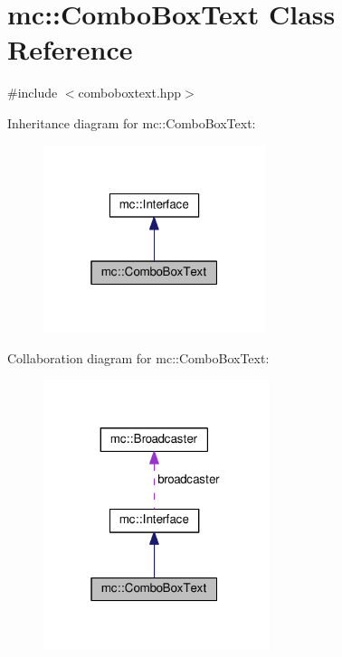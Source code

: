 \hypertarget{classmc_1_1ComboBoxText}{}\section{mc\+:\+:Combo\+Box\+Text Class Reference}
\label{classmc_1_1ComboBoxText}


{\ttfamily \#include $<$comboboxtext.\+hpp$>$}



Inheritance diagram for mc\+:\+:Combo\+Box\+Text\+:\nopagebreak
\begin{figure}[H]
\begin{center}
\leavevmode
\includegraphics[width=184pt]{classmc_1_1ComboBoxText__inherit__graph}
\end{center}
\end{figure}


Collaboration diagram for mc\+:\+:Combo\+Box\+Text\+:\nopagebreak
\begin{figure}[H]
\begin{center}
\leavevmode
\includegraphics[width=187pt]{classmc_1_1ComboBoxText__coll__graph}
\end{center}
\end{figure}
